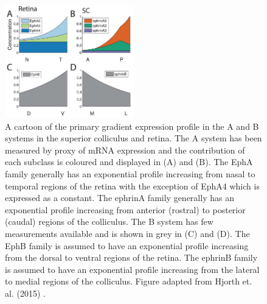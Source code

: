 \begin{figure}
	\centering
	\includegraphics[width = 0.5\textwidth]{images/introduction/gradientsEphEphrinMeasured}
	\def\c{A cartoon of the primary gradient expression profile in the A and B systems in the superior colliculus and retina. }
	\caption[\c]{\label{fig:measuregradients} \c The A system has been measured by proxy of mRNA expression and the contribution of each subclass is coloured and displayed in (A) and (B). The EphA family generally has an exponential profile increasing from nasal to temporal regions of the retina with the exception of EphA4 which is expressed as a constant. The ephrinA family generally has an exponential profile increasing from anterior (rostral) to posterior (caudal) regions of the colliculus. The B system has few measurements available and is shown in grey in (C) and (D). The EphB  family is assumed to have an exponential profile increasing from the dorsal to ventral regions of the retina. The ephrinB family is assumed to have an exponential profile increasing from the lateral to medial regions of the colliculus. Figure adapted from Hjorth et. al. (2015) \cite{Hjorth2015-le}.}
\end{figure}
